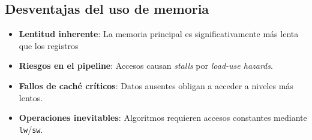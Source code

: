 \documentclass{article}
\begin{document}
\subsection*{Desventajas del uso de memoria}
\begin{itemize}
    \item \textbf{Lentitud inherente}: La memoria principal es significativamente más lenta que los registros
    \item \textbf{Riesgos en el pipeline}: Accesos causan \textit{stalls} por \textit{load-use hazards}.
    \item \textbf{Fallos de caché críticos}: Datos ausentes obligan a acceder a niveles más lentos.
    \item \textbf{Operaciones inevitables}: Algoritmos requieren accesos constantes mediante \texttt{lw}/\texttt{sw}.
\end{itemize}
\end{document}
